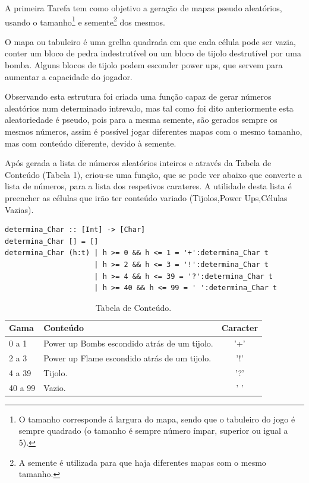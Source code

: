 \documentclass[4apaper]{report}
\begin{document}
A primeira Tarefa tem como objetivo a geração de mapas pseudo aleatórios, usando o tamanho\footnote{O tamanho corresponde á largura do mapa, sendo que o tabuleiro do jogo é sempre quadrado (o tamanho é sempre número ímpar, superior ou igual a 5).} e semente\footnote{A semente é utilizada para que haja diferentes mapas com o mesmo tamanho.} dos mesmos. 

O mapa ou tabuleiro é uma grelha quadrada em que cada célula pode ser vazia, conter um bloco de pedra indestrutível ou um bloco de tijolo destrutível por uma bomba. Alguns blocos de tijolo podem esconder power ups, que servem para aumentar a capacidade do jogador.

Observando esta estrutura foi criada uma função capaz de gerar números aleatórios num determinado intrevalo, mas tal como foi dito anteriormente esta aleatoriedade é pseudo, pois para a mesma semente, são gerados sempre os mesmos números, assim é possível jogar diferentes mapas com o mesmo tamanho, mas com conteúdo diferente, devido à semente. 

Após gerada a lista de números aleatórios inteiros e através da Tabela de Conteúdo (Tabela 1), criou-se uma função, que se pode ver abaixo que converte a lista de números, para a lista dos respetivos carateres. A utilidade desta lista é preencher as células que irão ter conteúdo variado (Tijolos,Power Ups,Células Vazias).

\begin{verbatim}
determina_Char :: [Int] -> [Char]
determina_Char [] = [] 
determina_Char (h:t) | h >= 0 && h <= 1 = '+':determina_Char t 
                     | h >= 2 && h <= 3 = '!':determina_Char t 
                     | h >= 4 && h <= 39 = '?':determina_Char t 
                     | h >= 40 && h <= 99 = ' ':determina_Char t
\end{verbatim}

\begin{table}[ht]
\centering
\begin{tabular}[t]{|l|l|c|}\hline
	Gama & Conteúdo & Caracter \\\hline
	0 a 1 & Power up Bombs escondido atrás de um tijolo. & '+'\\\hline
	2 a 3 & Power up Flame escondido atrás de um tijolo. & '!'\\\hline
	4 a 39 & Tijolo. & '?' \\\hline
	40 a 99 & Vazio. & ' '\\\hline
	\end{tabular}
	\caption{Tabela de Conteúdo.}
	\label{table:tabConteudo}
\end{table}
\end{document}
